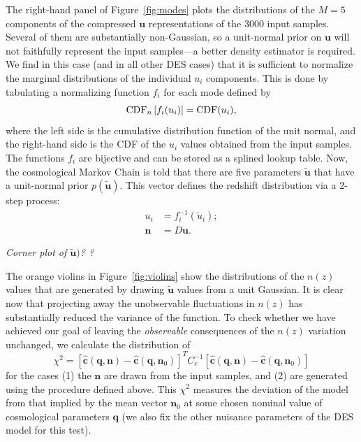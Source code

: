 \documentclass[linenumbers, onecolumn]{aastex63}
\newcommand{\vecq}{\ensuremath{\mathbf{q}}}
\newcommand{\vecn}{\ensuremath{\mathbf{n}}}
\newcommand{\vecu}{\ensuremath{\mathbf{u}}}
\newcommand{\hatc}{\ensuremath{\hat{\mathbf{c}}}}
\newcommand{\covm}{C}
\newcommand{\matD}{D}
\begin{document}
The right-hand panel of Figure~\ref{fig:modes} plots the distributions
of the $M=5$ components of the compressed $\vecu$ representations of the
3000 input samples.  Several of them are substantially non-Gaussian,
so a unit-normal prior on $\vecu$ will not faithfully represent the
input samples---a better density estimator is required.  We find in
this case (and in all other DES cases) that it is sufficient to
normalize the marginal distributions of the individual $u_i$
components.  This is done by tabulating a normalizing function $f_i$
for each mode defined by
\begin{equation}
  {\rm CDF}_n\left[ f_i(u_i) \right] = {\rm CDF}(u_i),
\end{equation}
where the left side is the cumulative distribution function of the
unit normal, and the right-hand side is the CDF of the $u_i$ values
obtained from the input samples.  The functions $f_i$ are bijective
and can be stored as a splined lookup table.
Now, the cosmological Markov Chain
is told that there are five parameters $\widetilde{\vecu}$ that have a
unit-normal prior $p(\widetilde{\vecu}).$  This vector defines the
redshift distribution via a 2-step process:
\begin{align}
  u_i & =f_i^{-1}(\widetilde{u}_i); \\
  \vecn & = \matD \vecu.
\end{align}

\textit{Corner plot of $\widetilde{\vecu})$? ?}


The orange violins in Figure~\ref{fig:violins} show the distributions
of the $n(z)$ values that are generated by drawing $\widetilde{\vecu}$
values from a unit Gaussian.  It is clear now that projecting away the
unobservable fluctuations in $n(z)$ has substantially reduced the
variance of the function.  To check whether we have achieved our goal
of leaving the \emph{observable} consequences of the $n(z)$ variation
unchanged, we calculate the distribution of
\begin{equation}
  \chi^2 =  \left[\hatc(\vecq,\vecn) - \hatc(\vecq,\vecn_0) \right]^T
                                           \covm_c^{-1}  \left[ \hatc(\vecq,\vecn) - \hatc(\vecq,\vecn_0)\right]
\label{eq:chihist}
\end{equation}
for the cases (1) the $\vecn$ are drawn from the input samples, and
(2) are generated using the procedure defined above.  This $\chi^2$
measures the deviation of the model from that implied by the mean
vector $\vecn_0$ at some chosen nominal value of cosmological
parameters $\vecq$ (we also fix the other nuisance parameters of the
DES model for this test).
\end{document}
